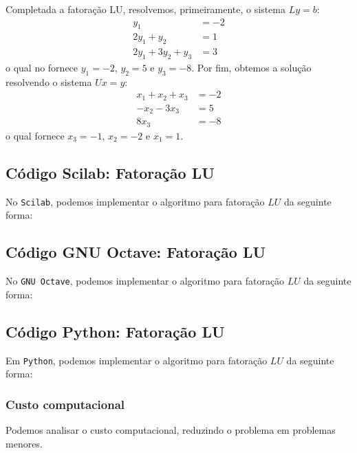 \begin{sol}
Completada a fatoração LU, resolvemos, primeiramente, o sistema $Ly = b$:
\begin{equation*}
  \begin{split}
    y_1 &= -2\\
    2y_1 + y_2 &= 1\\
    2y_1 + 3y_2 + y_3 &= 3
  \end{split}
\end{equation*}
o qual no fornece $y_1 = -2$, $y_2 = 5$ e $y_3 = -8$. Por fim, obtemos a solução resolvendo o sistema $Ux = y$:
\begin{equation*}
  \begin{split}
  x_1 + x_2 + x_3 &= -2\\
  -x_2 - 3x_3 &= 5\\
  8x_3 &= -8
  \end{split}
\end{equation*}
o qual fornece $x_3 = -1$, $x_2 = -2$ e $x_1 = 1$.
\end{sol}

\ifisscilab
\subsection{Código Scilab: Fatoração LU}
No \verb+Scilab+, podemos implementar o algoritmo para fatoração $LU$ da seguinte forma:
%

\fi
\ifisoctave
\subsection{Código GNU Octave: Fatoração LU}
No \verb+GNU Octave+, podemos implementar o algoritmo para fatoração $LU$ da seguinte forma:

\fi
\ifispython
\subsection{Código Python: Fatoração LU}
Em \verb+Python+, podemos implementar o algoritmo para fatoração $LU$ da seguinte forma:

\fi

\ifisscilab
\subsubsection{Custo computacional}
Podemos analisar o custo computacional, reduzindo o problema em problemas menores. %


